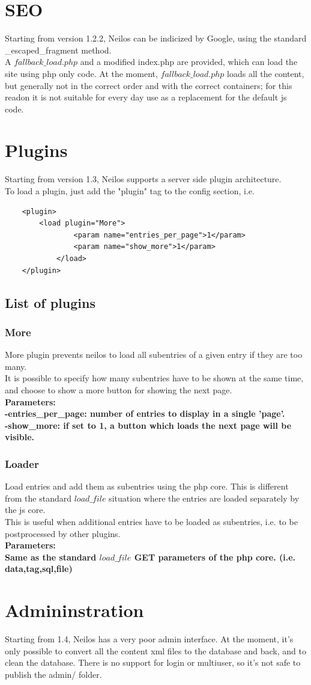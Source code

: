 \documentclass[a4paper,12pt]{article}
\begin{document}
\section{SEO}
Starting from version 1.2.2, Neilos can be indicized by Google, using the standard \_escaped\_fragment method.\\
A $fallback\_load.php$ and a modified index.php are provided, which can load the site using php only code.
At the moment, $fallback\_load.php$ loads all the content, but generally not in the correct order and with the correct containers; for this readon it is not suitable for every day use as a replacement for the default js code.

\section{Plugins}
Starting from version 1.3, Neilos supports a server side plugin architecture.\\
To load a plugin, just add the "plugin" tag to the config section, i.e.
\begin{verbatim}
    <plugin>
	    <load plugin="More">
                <param name="entries_per_page">1</param>
                <param name="show_more">1</param>
            </load>
    </plugin>
        \end{verbatim}
\subsection{List of plugins}
\subsubsection{More}
More plugin prevents neilos to load all subentries of a given entry if they are too many.\\
It is possible to specify how many subentries have to be shown at the same time, and choose to show a more button for showing the next page.\\
\bfseries Parameters:\\
\normalfont \normalsize -entries\_per\_page: number of entries to display in a single 'page'.\\
-show\_more: if set to 1, a button which loads the next page will be visible.\\
\subsubsection{Loader}
Load entries and add them as subentries using the php core. This is different from the standard $load\_file$ situation where the entries are loaded separately by the js core.\\
This is useful when additional entries have to be loaded as subentries, i.e. to be postprocessed by other plugins.\\
\bfseries Parameters:\\
\normalfont \normalsize Same as the standard $load\_file$ GET parameters of the php core. (i.e. data,tag,sql,file)
\section{Admininstration}
Starting from 1.4, Neilos has a very poor admin interface. At the moment, it's only possible to convert all the content xml files to the database and back, and to clean the database. There is no support for login or multiuser, so it's not safe to publish the admin/ folder.
\end{document}
